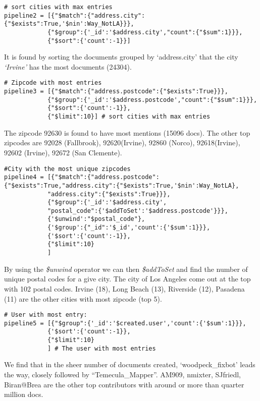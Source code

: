 \documentclass[12pt]{article}
\begin{document}
\begin{verbatim}
# sort cities with max entries
pipeline2 = [{"$match":{"address.city":{"$exists":True,'$nin':Way_NotLA}}},
            {"$group":{'_id':'$address.city',"count":{"$sum":1}}},
            {"$sort":{'count':-1}}] 
\end{verbatim}

It is found by sorting the documents grouped by `address.city' that the
city \emph{`Irvine'} has the most documents (24304).

\begin{verbatim}
# Zipcode with most entries
pipeline3 = [{"$match":{"address.postcode":{"$exists":True}}},
            {"$group":{'_id':'$address.postcode',"count":{"$sum":1}}},
            {"$sort":{'count':-1}},
            {"$limit":10}] # sort cities with max entries       
\end{verbatim}

The zipcode 92630 is found to have most mentions (15096 docs). The other
top zipcodes are 92028 (Fallbrook), 92620(Irvine), 92860 (Norco),
92618(Irvine), 92602 (Irvine), 92672 (San Clemente).

\begin{verbatim}
#City with the most unique zipcodes
pipeline4 = [{"$match":{"address.postcode":{"$exists":True,"address.city":{"$exists":True,'$nin':Way_NotLA},
            "address.city":{"$exists":True}}},
            {"$group":{'_id':'$address.city',
            "postal_code":{'$addToSet':'$address.postcode'}}},
            {'$unwind':"$postal_code"},
            {'$group':{"_id":'$_id','count':{'$sum':1}}},            
            {'$sort':{'count':-1}},
            {"$limit":10}            
            ]
\end{verbatim}

By using the \emph{\$unwind} operator we can then \emph{\$addToSet} and
find the number of unique postal codes for a give city. The city of Los
Angeles come out at the top with 102 postal codes. Irvine (18), Long
Beach (13), Riverside (12), Pasadena (11) are the other cities with most
zipcode (top 5).

\begin{verbatim}
# User with most entry:
pipeline5 = [{"$group":{'_id':'$created.user','count':{'$sum':1}}},
            {'$sort':{'count':-1}},
            {"$limit":10}            
            ] # The user with most entries
\end{verbatim}

We find that in the sheer number of documents created,
`woodpeck\_fixbot' leads the way, closely followed by
``Temecula\_Mapper''. AM909, nmixter, SJfriedl, Biran@Brea are the other
top contributors with around or more than quarter million docs.
\end{document}
